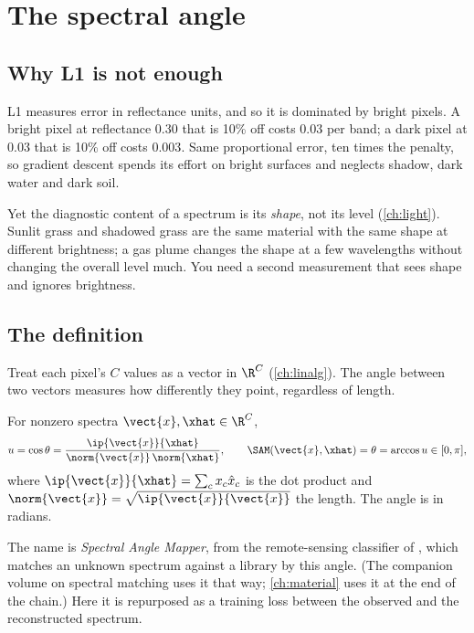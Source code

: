\section{The spectral angle}\label{sec:losses:sam}

\subsection{Why L1 is not enough}

L1 measures error in reflectance units, and so it is dominated by bright pixels. A bright pixel
at reflectance 0.30 that is 10\% off costs $0.03$ per band; a dark pixel at 0.03 that is 10\%
off costs $0.003$. Same proportional error, ten times the penalty, so gradient descent spends
its effort on bright surfaces and neglects shadow, dark water and dark soil.

Yet the diagnostic content of a spectrum is its \emph{shape}, not its level
(\cref{ch:light}). Sunlit grass and shadowed grass are the same material with the same shape at
different brightness; a gas plume changes the shape at a few wavelengths without changing the
overall level much. You need a second measurement that sees shape and ignores brightness.

\subsection{The definition}

Treat each pixel's $C$ values as a vector in $\R^C$ (\cref{ch:linalg}). The angle between two
vectors measures how differently they point, regardless of length.

\begin{definition}
For nonzero spectra $\vect{x}, \xhat \in \R^C$,
\begin{equation}\label{eq:losses:sam}
u = \cos\theta = \frac{\ip{\vect{x}}{\xhat}}{\norm{\vect{x}}\,\norm{\xhat}},
\qquad
\SAM(\vect{x}, \xhat) = \theta = \arccos u \in [0, \pi],
\end{equation}
where $\ip{\vect{x}}{\xhat} = \sum_c x_c \hat{x}_c$ is the dot product and $\norm{\vect{x}} =
\sqrt{\ip{\vect{x}}{\vect{x}}}$ the length. The angle is in radians.
\end{definition}

The name is \emph{Spectral Angle Mapper}, from the remote-sensing
classifier of \citet{kruse1993spectral}, which matches an unknown spectrum against a library by
this angle. (The companion volume on spectral matching uses it that way; \cref{ch:material}
uses it at the end of the chain.) Here it is repurposed as a training loss between the
observed and the reconstructed spectrum.

